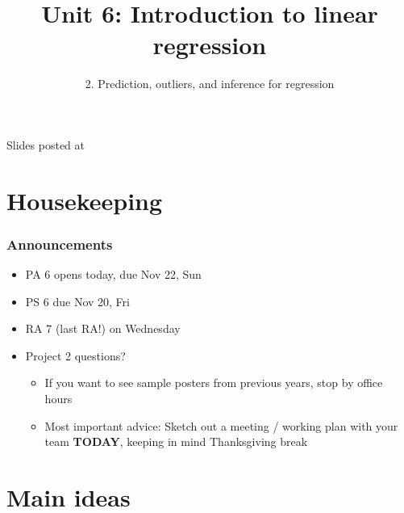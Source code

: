 \documentclass[11pt,containsverbatim,handout,xcolor=xelatex,dvipsnames,table]{beamer}
\title{Unit 6: Introduction to linear regression}
\subtitle{2. Prediction, outliers, and inference for regression}
\author{\CourseName}
\date{}
\institute{\InstituteName}
\begin{document}



\begin{frame}[plain]

\titlepage

\vfill

{\scriptsize {} \hfill Slides posted at  \webURL{\CourseSite}}

\addtocounter{framenumber}{-1} 

\end{frame}


\section{Housekeeping}


\begin{frame}
\frametitle{Announcements}

\begin{itemize}

\item PA 6 opens today, due Nov 22, Sun

\item PS 6 due Nov 20, Fri

\item RA 7 (last RA!) on Wednesday

\item Project 2 questions?
\begin{itemize}
\item If you want to see sample posters from previous years, stop by office hours
\item Most important advice: Sketch out a meeting / working plan with your team \textbf{TODAY}, keeping in mind
Thanksgiving break
\end{itemize}

\end{itemize}

\end{frame}


\section{Main ideas}
\end{document}
